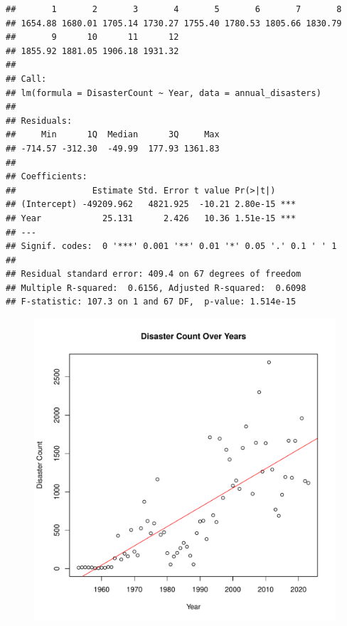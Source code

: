 \documentclass[12pt]{report}\usepackage[]{graphicx}\usepackage[]{xcolor}
\makeatletter
\def\maxwidth{ %
  \ifdim\Gin@nat@width>\linewidth
    \linewidth
  \else
    \Gin@nat@width
  \fi
}
\newenvironment{kframe}{%
 \def\at@end@of@kframe{}%
 \ifinner\ifhmode%
  \def\at@end@of@kframe{\end{minipage}}%
  \begin{minipage}{\columnwidth}%
 \fi\fi%
 \def\FrameCommand##1{\hskip\@totalleftmargin \hskip-\fboxsep
 \colorbox{shadecolor}{##1}\hskip-\fboxsep
     \hskip-\linewidth \hskip-\@totalleftmargin \hskip\columnwidth}%
 \MakeFramed {\advance\hsize-\width
   \@totalleftmargin\z@ \linewidth\hsize
   \@setminipage}}%
 {\par\unskip\endMakeFramed%
 \at@end@of@kframe}
\newenvironment{knitrout}{}{} %
\makeatother
\begin{document}
\clearpage
\begin{knitrout}
\color{fgcolor}\begin{kframe}
\begin{verbatim}
##       1       2       3       4       5       6       7       8 
## 1654.88 1680.01 1705.14 1730.27 1755.40 1780.53 1805.66 1830.79 
##       9      10      11      12 
## 1855.92 1881.05 1906.18 1931.32
## 
## Call:
## lm(formula = DisasterCount ~ Year, data = annual_disasters)
## 
## Residuals:
##     Min      1Q  Median      3Q     Max 
## -714.57 -312.30  -49.99  177.93 1361.83 
## 
## Coefficients:
##               Estimate Std. Error t value Pr(>|t|)    
## (Intercept) -49209.962   4821.925  -10.21 2.80e-15 ***
## Year            25.131      2.426   10.36 1.51e-15 ***
## ---
## Signif. codes:  0 '***' 0.001 '**' 0.01 '*' 0.05 '.' 0.1 ' ' 1
## 
## Residual standard error: 409.4 on 67 degrees of freedom
## Multiple R-squared:  0.6156,	Adjusted R-squared:  0.6098 
## F-statistic: 107.3 on 1 and 67 DF,  p-value: 1.514e-15
\end{verbatim}
\end{kframe}
\end{knitrout}

\begin{figure}[h!]
\centering
  \begin{minipage}{.8\linewidth}
\begin{knitrout}
\color{fgcolor}
\includegraphics[width=\maxwidth]{figure/plot_data_points-1} 
\end{knitrout}
  \label{figure:2}
  \end{minipage}
\end{figure}
\end{document}
